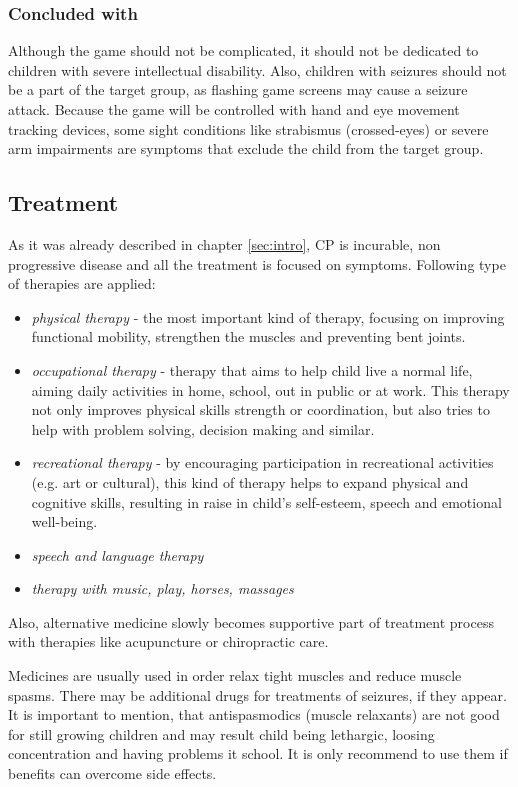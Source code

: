\subsubsection*{Concluded with}
Although the game should not be complicated, it should not be dedicated to children with severe intellectual disability. Also, children with seizures should not be a part of the target group, as flashing game screens may cause a seizure attack. Because the game will be controlled with hand and eye movement tracking devices, some sight conditions like strabismus (crossed-eyes) or severe arm impairments are symptoms that exclude the child from the target group.

\subsection{Treatment}
As it was already described in chapter \ref{sec:intro}, CP is incurable, non progressive disease and all the treatment is focused on symptoms. Following type of therapies are applied:
\begin{itemize}
\item \emph{physical therapy} - the most important kind of therapy, focusing on improving functional mobility, strengthen the muscles and preventing bent joints.
\item \emph{occupational therapy} - therapy that aims to help child live a normal life, aiming daily activities in home, school, out in public or at work. This therapy not only improves physical skills strength or coordination, but also tries to help with problem solving, decision making and similar.
\item \emph{recreational therapy} - by encouraging participation in recreational activities	(e.g. art or cultural), this kind of therapy helps to expand physical and cognitive skills, resulting in raise in child's self-esteem, speech and emotional well-being.
\item \emph{speech and language therapy}
\item \emph{therapy with music, play, horses, massages}
\end{itemize}

Also, alternative medicine slowly becomes supportive part of treatment process with therapies like acupuncture or chiropractic care. 

Medicines are usually used in order relax tight muscles and reduce muscle spasms. There may be additional drugs for treatments of seizures, if they appear. It is important to mention, that antispasmodics (muscle relaxants) are not good for still growing children and may result child being lethargic, loosing concentration and having problems it school. It is only recommend to use them if benefits can overcome side effects. 

